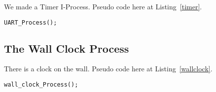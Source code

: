 \documentclass[oneside]{article}
\begin{document}
We made a Timer I-Process. Pseudo code here at Listing~\ref{timer}.

\begin{lstlisting}
UART_Process();
\end{lstlisting}

\subsection*{The Wall Clock Process}

There is a clock on the wall. Pseudo code here at Listing~\ref{wallclock}.

\begin{lstlisting}
wall_clock_Process();
\end{lstlisting}
\end{document}
